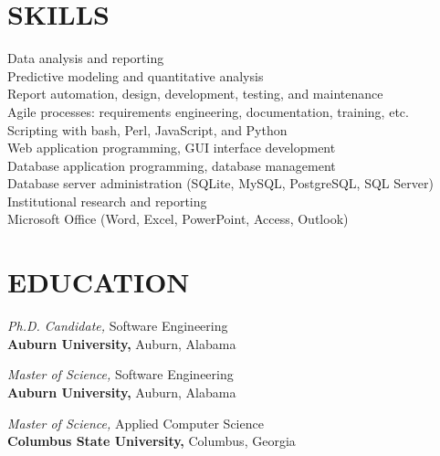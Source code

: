 \documentclass[margin, 10pt]{res} %
\begin{document}
\begin{resume}

 
\section{SKILLS}  

Data analysis and reporting\\
Predictive modeling and quantitative analysis\\
Report automation, design, development, testing, and maintenance\\
Agile processes: requirements engineering, documentation, training, etc.\\
Scripting with bash, Perl, JavaScript, and Python\\
Web application programming, GUI interface development\\
Database application programming, database management\\
Database server administration (SQLite, MySQL, PostgreSQL, SQL Server)\\
Institutional research and reporting\\
Microsoft Office (Word, Excel, PowerPoint, Access, Outlook)\\


\section{EDUCATION}

{\it Ph.D. Candidate,} Software Engineering\\
\textbf{Auburn University,} Auburn, Alabama

{\it Master of Science,} Software Engineering\\
\textbf{Auburn University,} Auburn, Alabama

{\it Master of Science,} Applied Computer Science\\
\textbf{Columbus State University,} Columbus, Georgia


\end{resume}
\end{document}
